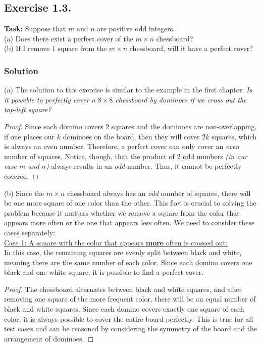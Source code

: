 \documentclass{article}
\begin{document}
\subsection{Exercise 1.3.}
\textbf{Task:} Suppose that $m$ and $n$ are positive odd integers.\\
(a) Does there exist a perfect cover of the $m  \times n$ chessboard? \\
(b) If I remove $1$ square from the  $m \times n$  chessboard, will it have a perfect cover?

\subsubsection*{Solution}

(a) The solution to this exercise is similar to the example in the first chapter: \textit{Is it possible to perfectly cover a $8 \times 8$ chessboard by dominoes if we cross out the top-left square?}

\begin{proof} 
Since each domino covers $2$ squares and the dominoes are non-overlapping, if one places our $k$ dominoes on the board, then they will cover $2k$ squares, which is always an even number. Therefore, a perfect cover can only cover an \textit{even} number of squares. Notice, though, that the product of $2$ odd numbers \textit{(in our case $m$ and $n$)} always results in an \textit{odd} number. Thus, it cannot be perfectly covered.
\end{proof} 

\newpage

\noindent(b) Since the $m \times n$ chessboard always has an \textit{odd} number of squares, there will be one more square of one color than the other. This fact is crucial to solving the problem because it matters whether we remove a square from the color that appears more often or the one that appears less often. We need to consider these cases separately: \\

\underline{Case 1: A square with the color that appears \textbf{more} often is crossed out:}\\
In this case, the remaining squares are evenly split between black and white, meaning there are the same number of each color. Since each domino covers one black and one white square, it is possible to find a perfect cover.

\begin{proof} The chessboard alternates between black and white squares, and after removing one square of the more frequent color, there will be an equal number of black and white squares. Since each domino covers exactly one square of each color, it is always possible to cover the entire board perfectly. This is true for all test cases and can be reasoned by considering the symmetry of the board and the arrangement of dominoes. \end{proof}
\end{document}
